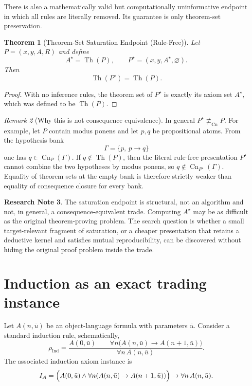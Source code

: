 \documentclass[11pt]{article}
\newtheorem{theorem}{Theorem}[section]
\theoremstyle{definition}
\newtheorem{researchnote}[theorem]{Research Note}
\theoremstyle{remark}
\newtheorem{remark}[theorem]{Remark}
\newcommand{\Cn}{\operatorname{Cn}}
\newcommand{\Th}{\operatorname{Th}}
\newcommand{\equivCn}{\equiv_{\mathrm{Cn}}}
\begin{document}
There is also a mathematically valid but computationally uninformative endpoint in which all rules are literally removed. Its guarantee is only theorem-set preservation.

\begin{theorem}[Theorem-Set Saturation Endpoint (Rule-Free)]\label{thm:saturation}
Let $P=(x,y,A,R)$ and define
\[
A^\star=\Th(P),\qquad P^\star=(x,y,A^\star,\varnothing).
\]
Then
\[
\Th(P^\star)=\Th(P).
\]
\end{theorem}

\begin{proof}
With no inference rules, the theorem set of $P^\star$ is exactly its axiom set $A^\star$, which was defined to be $\Th(P)$.
\end{proof}

\begin{remark}[Why this is not consequence equivalence]
In general $P^\star\not\equivCn P$. For example, let $P$ contain modus ponens and let $p,q$ be propositional atoms. From the hypothesis bank
\[
\Gamma=\{p,\ p\to q\}
\]
one has $q\in\Cn_P(\Gamma)$. If $q\notin\Th(P)$, then the literal rule-free presentation $P^\star$ cannot combine the two hypotheses by modus ponens, so $q\notin\Cn_{P^\star}(\Gamma)$. Equality of theorem sets at the empty bank is therefore strictly weaker than equality of consequence closure for every bank.
\end{remark}

\begin{researchnote}
The saturation endpoint is structural, not an algorithm and not, in general, a consequence-equivalent trade. Computing $A^\star$ may be as difficult as the original theorem-proving problem. The search question is whether a small target-relevant fragment of saturation, or a cheaper presentation that retains a deductive kernel and satisfies mutual reproducibility, can be discovered without hiding the original proof problem inside the trade.
\end{researchnote}

\section{Induction as an exact trading instance}
Let $A(n,\bar u)$ be an object-language formula with parameters $\bar u$. Consider a standard induction rule, schematically,
\[
\rho_{\mathrm{Ind}}=
\frac{A(0,\bar u)\qquad \forall n\bigl(A(n,\bar u)\to A(n+1,\bar u)\bigr)}
{\forall n\,A(n,\bar u)}.
\]
The associated induction axiom instance is
\[
I_A=\Bigl(A(0,\bar u)\land\forall n(A(n,\bar u)\to A(n+1,\bar u))\Bigr)
\to\forall n\,A(n,\bar u).
\]
\end{document}
